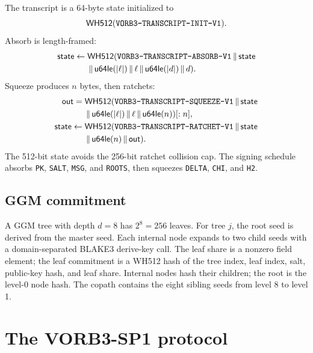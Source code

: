 \documentclass[11pt,a4paper]{article}
\begin{document}
The transcript is a 64-byte state initialized to
\[
\mathsf{WH512}(\texttt{VORB3-TRANSCRIPT-INIT-V1}).
\]
Absorb is length-framed:
\begin{align*}
\mathsf{state}\gets{}&
\mathsf{WH512}(\texttt{VORB3-TRANSCRIPT-ABSORB-V1}\,\|\,\mathsf{state}\\
&\,\|\,\mathsf{u64le}(|\ell|)\,\|\,\ell
\,\|\,\mathsf{u64le}(|d|)\,\|\, d).
\end{align*}
Squeeze produces $n$ bytes, then ratchets:
\begin{align*}
\mathsf{out}={}&
\mathsf{WH512}(\texttt{VORB3-TRANSCRIPT-SQUEEZE-V1}\,\|\,\mathsf{state}\\
&\,\|\,\mathsf{u64le}(|\ell|)\,\|\,\ell
\,\|\,\mathsf{u64le}(n))[:n],\\
\mathsf{state}\gets{}&
\mathsf{WH512}(\texttt{VORB3-TRANSCRIPT-RATCHET-V1}\,\|\,\mathsf{state}\\
&\,\|\,\mathsf{u64le}(n)\,\|\,\mathsf{out}).
\end{align*}
The 512-bit state avoids the 256-bit ratchet collision cap. The signing
schedule absorbs \texttt{PK}, \texttt{SALT}, \texttt{MSG}, and
\texttt{ROOTS}, then squeezes \texttt{DELTA}, \texttt{CHI}, and \texttt{H2}.

\subsection{GGM commitment}

A GGM tree with depth $d=8$ has $2^8=256$ leaves. For tree $j$, the root
seed is derived from the master seed. Each internal node expands to two child
seeds with a domain-separated BLAKE3 derive-key call. The leaf share is a
nonzero field element; the leaf commitment is a WH512 hash of the tree index,
leaf index, salt, public-key hash, and leaf share. Internal nodes hash their
children; the root is the level-0 node hash. The copath contains the eight
sibling seeds from level 8 to level 1.

\section{The VORB3-SP1 protocol}
\label{sec:protocol}
\end{document}
